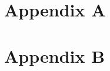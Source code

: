 \documentclass[11pt]{article}
\begin{document}
\newpage{}

\renewcommand{\theequation}{A\arabic{equation}}
\renewcommand{\thetable}{A\arabic{table}}
\renewcommand{\thefigure}{A\arabic{figure}}

\setcounter{figure}{0}
\setcounter{equation}{0}  %
\setcounter{table}{0}

\section*{Appendix A}


\section*{Appendix B}


\newpage{}

%
%


%
\end{document}
